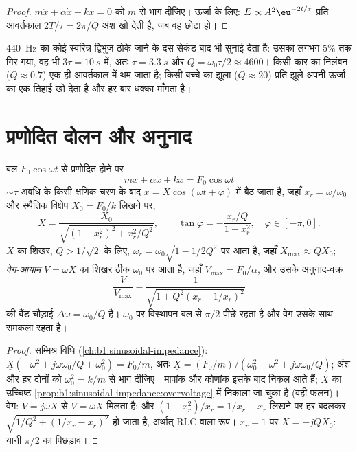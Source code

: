 \begin{proof}
$m\ddot x + \alpha\dot x + kx = 0$ को $m$ से भाग दीजिए। ऊर्जा के लिए: $E
\propto A^2\eu^{-2t/\tau}$ प्रति आवर्तकाल $2T/\tau = 2\pi/Q$ अंश खो देती
है, जब वह छोटा हो।
\end{proof}

\begin{example}[गूँजने के समय]\label{ex:b1:oscillators-resonance:ringing}
\qty{440}{Hz} का कोई स्वरित्र द्विभुज ठोके जाने के दस सेकंड बाद भी सुनाई
देता है: उसका  लगभग $5\%$ तक गिर गया, वह भी $3\tau = \qty{10}{s}$ में, अतः
$\tau = \qty{3.3}{s}$ और $Q = \omega_0\tau/2 \approx 4600$। किसी कार का
निलंबन ($Q \approx 0.7$) एक ही आवर्तकाल में थम जाता है; किसी बच्चे का झूला
($Q \approx 20$) प्रति झूले अपनी ऊर्जा का एक तिहाई खो देता है और हर बार
धक्का माँगता है।
\end{example}

\section{प्रणोदित दोलन और अनुनाद}

\begin{theorem}[ज्यावक्रीय रूप से प्रणोदित दोलित्र]\label{thm:b1:oscillators-resonance:forced}
बल $F_0\cos\omega t$ से प्रणोदित होने पर 
\[
m\ddot x + \alpha\dot x + kx = F_0\cos\omega t
\]
$\sim\tau$ अवधि के किसी क्षणिक चरण के बाद 
$x = X\cos(\omega t + \varphi)$ में बैठ जाता है, जहाँ $x_r = \omega/\omega_0$
और स्थैतिक विक्षेप $X_0 = F_0/k$ लिखने पर,
\[
X = \frac{X_0}{\sqrt{(1 - x_r^2)^2 + x_r^2/Q^2}}, \qquad
\tan\varphi = -\frac{x_r/Q}{1 - x_r^2}, \quad \varphi \in [-\pi, 0] .
\]
\emph{} $X$ का शिखर, $Q > 1/\sqrt2$ के लिए, $\omega_r =
\omega_0\sqrt{1 - 1/2Q^2}$ पर आता है, जहाँ $X_{\max} \approx QX_0$;
\emph{वेग-आयाम} $V = \omega X$ का शिखर ठीक $\omega_0$ पर आता है, जहाँ $V_{\max} =
F_0/\alpha$, और उसके अनुनाद-वक्र
\[
\frac{V}{V_{\max}} = \frac{1}{\sqrt{1 + Q^2(x_r - 1/x_r)^2}}
\]
की बैंड-चौड़ाई $\Delta\omega = \omega_0/Q$ है। $\omega_0$ पर विस्थापन बल से
$\pi/2$ पीछे रहता है और वेग उसके साथ समकला रहता है।
\end{theorem}

\begin{proof}
सम्मिश्र विधि (\cref{ch:b1:sinusoidal-impedance}): $\underline X(-\omega^2
+ j\omega\omega_0/Q + \omega_0^2) = F_0/m$, अतः $\underline X = (F_0/m)/(\omega_0^2
- \omega^2 + j\omega\omega_0/Q)$; अंश और हर दोनों को $\omega_0^2 = k/m$ से भाग
दीजिए। मापांक और कोणांक इसके बाद निकल आते हैं; $X$ का उच्चिष्ठ
\cref{prop:b1:sinusoidal-impedance:overvoltage} में निकाला जा चुका है (वही
फलन)। वेग: $\underline V = j\omega\underline X$ से $V = \omega X$ मिलता है;
और $(1 - x_r^2)/x_r = 1/x_r - x_r$ लिखने पर हर बदलकर
$\sqrt{1/Q^2 + (1/x_r - x_r)^2}$ हो जाता है, अर्थात् RLC वाला रूप। $x_r = 1$
पर $\underline X = -jQX_0$: यानी $\pi/2$ का पिछड़ाव।
\end{proof}

